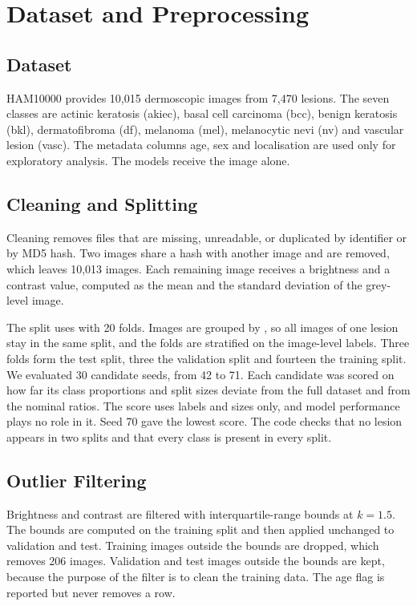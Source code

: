 \documentclass[10pt,twocolumn]{article}
\newcommand{\code}[1]{\texttt{\detokenize{#1}}}
\begin{document}
\section{Dataset and Preprocessing}
\label{sec:data}

\subsection{Dataset}
HAM10000 provides 10,015 dermoscopic images from 7,470 lesions. The seven classes are actinic keratosis (akiec), basal cell carcinoma (bcc), benign keratosis (bkl), dermatofibroma (df), melanoma (mel), melanocytic nevi (nv) and vascular lesion (vasc). The metadata columns age, sex and localisation are used only for exploratory analysis. The models receive the image alone.

\subsection{Cleaning and Splitting}
Cleaning removes files that are missing, unreadable, or duplicated by identifier or by MD5 hash. Two \code{nv} images share a hash with another image and are removed, which leaves 10,013 images. Each remaining image receives a brightness and a contrast value, computed as the mean and the standard deviation of the grey-level image.

The split uses \code{StratifiedGroupKFold} with 20 folds. Images are grouped by \code{lesion_id}, so all images of one lesion stay in the same split, and the folds are stratified on the image-level labels. Three folds form the test split, three the validation split and fourteen the training split. We evaluated 30 candidate seeds, from 42 to 71. Each candidate was scored on how far its class proportions and split sizes deviate from the full dataset and from the nominal ratios. The score uses labels and sizes only, and model performance plays no role in it. Seed 70 gave the lowest score. The code checks that no lesion appears in two splits and that every class is present in every split.

\subsection{Outlier Filtering}
Brightness and contrast are filtered with interquartile-range bounds at $k=1.5$. The bounds are computed on the training split and then applied unchanged to validation and test. Training images outside the bounds are dropped, which removes 206 images. Validation and test images outside the bounds are kept, because the purpose of the filter is to clean the training data. The age flag is reported but never removes a row.
\end{document}
